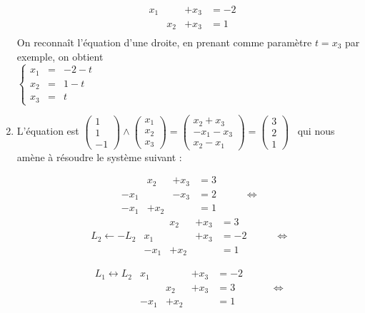 \documentclass{article}
\begin{document}
\begin{enumerate}
\[\begin{matrix} 
                               & x_1 & & +x_3 & =-2 \\
                                 &      &x_2  &+x_3 & = 1 \\
 \end{matrix}
\]
On reconnaît l'équation d'une droite, en prenant comme paramètre $t=x_3$ par exemple, on obtient \\
$\left\{ 
\begin{matrix}
x_1& = &-2-t \\
x_2&=&1-t \\
x_3&=&t
\end{matrix} \right.$


\item 
L'équation est 
$\begin{pmatrix} 
  1 \\ 1 \\ -1 
 \end{pmatrix}
\wedge 
\begin{pmatrix}
 x_1 \\x_2 \\ x_3
\end{pmatrix}
= 
\begin{pmatrix}
 x_2+x_3 \\ -x_1 - x_3 \\ x_2-x_1 
\end{pmatrix}
 = \begin{pmatrix}
    3\\2\\1
   \end{pmatrix}$
\ qui nous amène à résoudre le système suivant :

\[\begin{matrix}
   & x_2  &+ x_3 & = 3 \\
 -x_1  & & -x_3 & =2 \\
-x_1  & +x_2 &  &=1
 \end{matrix} 
 \hspace{1cm} \Leftrightarrow 
\]
\[\begin{matrix}
 &  & x_2  & +x_3 & = 3 \\
L_2 \leftarrow -L_2 &x_1  & & +x_3 & =-2 \\
& -x_1  &+x_2 &  &=1
 \end{matrix} 
 \hspace{1cm} \Leftrightarrow 
\]

\[ 
\begin{matrix} 
 L_1 \leftrightarrow  L_2 & x_1 & & +x_3 & =-2 \\
             &      &x_2  & +x_3 & = 3 \\
             & -x_1 &+x_2   &    & =1
 \end{matrix}
\hspace{1cm} \Leftrightarrow 
\]


\end{enumerate}
\end{document}
